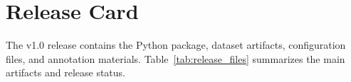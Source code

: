 \documentclass{article}
\begin{document}

\section{Release Card}
\label{app:release_card}

The v1.0 release contains the Python package, dataset artifacts,
configuration files, and annotation materials. Table~\ref{tab:release_files}
summarizes the main artifacts and release status.
\end{document}

